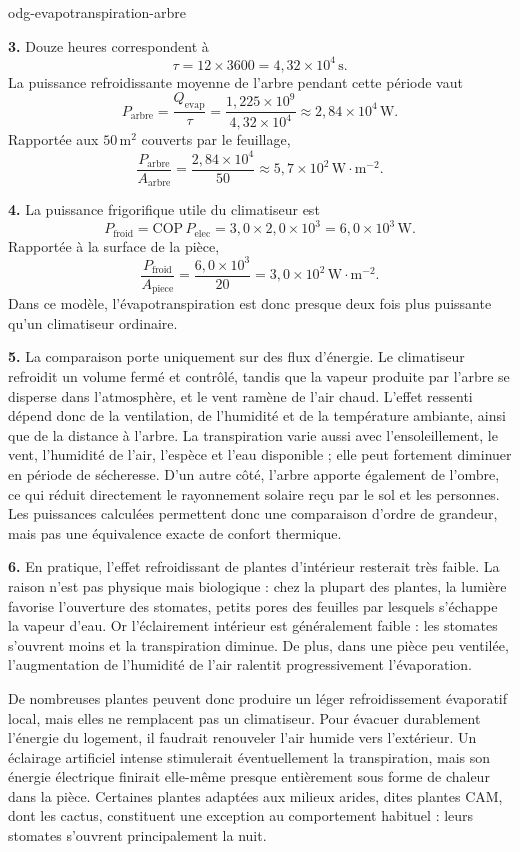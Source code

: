 \begin{exo}{odg-evapotranspiration-arbre}
\begin{solution}
\textbf{3.} Douze heures correspondent à
\[
\tau=12\times3600=4{,}32\times10^4\,\text{s}.
\]
La puissance refroidissante moyenne de l'arbre pendant cette période vaut
\[
P_{\text{arbre}}=\frac{Q_{\mathrm{evap}}}{\tau}
=\frac{1{,}225\times10^9}{4{,}32\times10^4}
\approx2{,}84\times10^4\,\text{W}.
\]
Rapportée aux $50\,\text{m}^2$ couverts par le feuillage,
\[
\frac{P_{\text{arbre}}}{A_{\text{arbre}}}
=\frac{2{,}84\times10^4}{50}
\approx5{,}7\times10^2\,\text{W}\!\cdot\!\text{m}^{-2}.
\]

\textbf{4.} La puissance frigorifique utile du climatiseur est
\[
P_{\text{froid}}=\mathrm{COP}\,P_{\mathrm{elec}}
=3{,}0\times2{,}0\times10^3
=6{,}0\times10^3\,\text{W}.
\]
Rapportée à la surface de la pièce,
\[
\frac{P_{\text{froid}}}{A_{\mathrm{piece}}}
=\frac{6{,}0\times10^3}{20}
=3{,}0\times10^2\,\text{W}\!\cdot\!\text{m}^{-2}.
\]
Dans ce modèle, l'évapotranspiration est donc presque deux fois plus puissante qu'un climatiseur ordinaire.

\textbf{5.} La comparaison porte uniquement sur des flux d'énergie. Le climatiseur refroidit un volume fermé et contrôlé, tandis que la vapeur produite par l'arbre se disperse dans l'atmosphère, et le vent ramène de l'air chaud. L'effet ressenti dépend donc de la ventilation, de l'humidité et de la température ambiante, ainsi que de la distance à l'arbre.
La transpiration varie aussi avec l'ensoleillement, le vent, l'humidité de l'air, l'espèce et l'eau disponible ; elle peut fortement diminuer en période de sécheresse. D'un autre côté, l'arbre apporte également de l'ombre, ce qui réduit directement le rayonnement solaire reçu par le sol et les personnes. Les puissances calculées permettent donc une comparaison d'ordre de grandeur, mais pas une équivalence exacte de confort thermique.

\textbf{6.} En pratique, l'effet refroidissant de plantes d'intérieur resterait très faible. La raison n'est pas physique mais biologique : chez la plupart des plantes, la lumière favorise l'ouverture des stomates, petits pores des feuilles par lesquels s'échappe la vapeur d'eau. Or l'éclairement intérieur est généralement faible : les stomates s'ouvrent moins et la transpiration diminue. De plus, dans une pièce peu ventilée, l'augmentation de l'humidité de l'air ralentit progressivement l'évaporation.

De nombreuses plantes peuvent donc produire un léger refroidissement évaporatif local, mais elles ne remplacent pas un climatiseur.
Pour évacuer durablement l'énergie du logement, il faudrait renouveler
l'air humide vers l'extérieur. Un éclairage artificiel intense stimulerait
éventuellement la transpiration, mais son énergie électrique finirait
elle-même presque entièrement sous forme de chaleur dans la pièce.
Certaines plantes adaptées aux milieux arides, dites plantes CAM, dont les cactus,
constituent une exception au comportement habituel :
leurs stomates s'ouvrent principalement la nuit.
\end{solution}

\end{exo}

